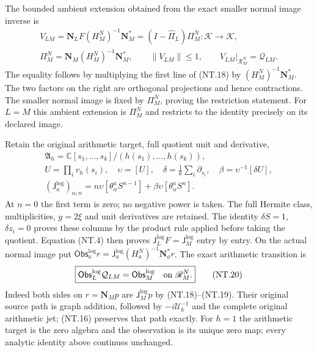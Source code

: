 \documentclass[11pt]{article}
\begin{document}
The bounded ambient extension obtained from the exact smaller normal
image inverse is
\[
 \begin{gathered}
 V_{LM}=\mathbf N_LF(H_M^N)^{-1}\mathbf N_M^*
       =(I-\widehat\Pi_L)\Pi_M^N:\mathscr K\to\mathscr K,\\
 \Pi_M^N=\mathbf N_M(H_M^N)^{-1}\mathbf N_M^*,\qquad
 \|V_{LM}\|\le1,\qquad
 V_{LM}|_{\mathscr R_M^N}=\mathcal Q_{LM}.
 \end{gathered}
 \tag{NT.18a}
\]
The equality follows by multiplying the first line of (NT.18) by
$(H_M^N)^{-1}\mathbf N_M^*$. The two factors on the right are
orthogonal projections and hence contractions. The smaller normal
image is fixed by $\Pi_M^N$, proving the restriction statement.
For $L=M$ this ambient extension is $\Pi_M^N$ and restricts
to the identity precisely on its declared image.

Retain the original arithmetic target, full quotient unit and derivative,
\[
 \begin{gathered}
 \mathfrak A_h=\mathbb C[s_1,\ldots,s_k]/(h(s_1),\ldots,h(s_k)),\\
 U=\prod_i v_h(s_i),\quad \upsilon=[U],\quad
 \delta=\frac1k\sum_i\partial_{s_i},\quad
 \beta=\upsilon^{-1}[\delta U],\\
 (\mathsf J_a^{\log})_{\alpha,n}
  =n\upsilon[\theta^a_\alpha S^{n-1}]
        +\beta\upsilon[\theta^a_\alpha S^n].
 \end{gathered}
 \tag{NT.19}
\]
At $n=0$ the first term is zero; no negative power is taken.
The full Hermite class, multiplicities, $g=2\xi$ and unit derivatives
are retained. The identity $\delta S=1$, $\delta z_i=0$ proves
these columns by the product rule applied before taking the quotient.
Equation (NT.4) then proves
$\mathsf J_L^{\log}F=\mathsf J_M^{\log}$ entry by entry.
On the actual normal image put
$\mathsf{Obs}_a^{\log}r=
\mathsf J_a^{\log}(H_a^N)^{-1}\mathbf N_a^*r$.
The exact arithmetic transition is
\[
 \boxed{\mathsf{Obs}_L^{\log}\mathcal Q_{LM}
              =\mathsf{Obs}_M^{\log}
                 \quad\hbox{on }\mathscr R_M^N.}
 \tag{NT.20}
\]
Indeed both sides on $r=\mathbf N_Mp$ are
$\mathsf J_M^{\log}p$ by (NT.18)--(NT.19).
Their original source path is graph addition, followed by
$-i\mathscr U_k^{-1}$ and the complete original arithmetic jet;
(NT.16) preserves that path exactly. For $h=1$ the arithmetic
target is the zero algebra and the observation is its unique zero
map; every analytic identity above continues unchanged.
\end{document}
